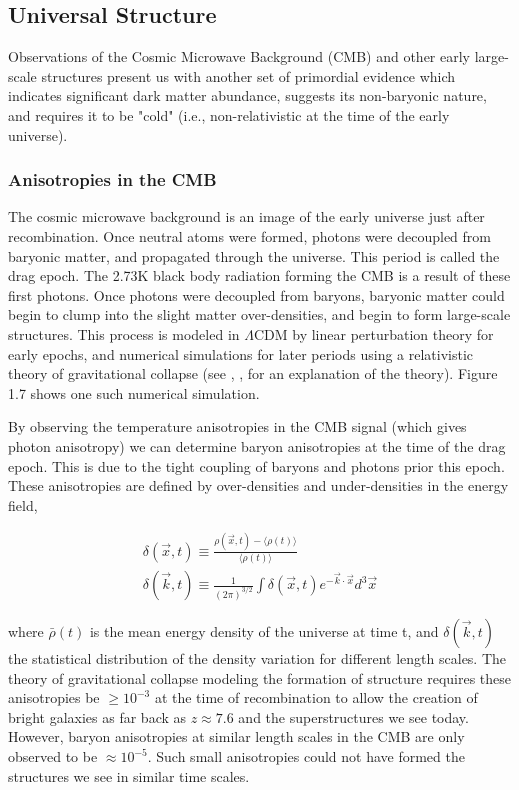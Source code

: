 \documentclass{report}
\begin{document}
\subsection{Universal Structure}
Observations of the Cosmic Microwave Background (CMB) and other early large-scale structures present us with another set of primordial evidence which indicates significant dark matter abundance, suggests its non-baryonic nature, and requires it to be "cold" (i.e., non-relativistic at the time of the early universe).

\subsubsection{Anisotropies in the CMB}
The cosmic microwave background is an image of the early universe just after recombination. Once neutral atoms were formed, photons were decoupled from baryonic matter, and propagated through the universe. This period is called the drag epoch. The 2.73K black body radiation forming the CMB is a result of these first photons. Once photons were decoupled from baryons, baryonic matter could begin to clump into the slight matter over-densities, and begin to form large-scale structures. This process is modeled in $\Lambda$CDM by linear perturbation theory for early epochs, and numerical simulations for later periods using a relativistic theory of gravitational collapse (see \cite{Kolb1990}, \cite{Padmanabhan1993}, \cite{Liddle2000} for an explanation of the theory). Figure 1.7 shows one such numerical simulation.

By observing the temperature anisotropies in the CMB signal (which gives photon anisotropy) we can determine baryon anisotropies at the time of the drag epoch. This is due to the tight coupling of baryons and photons prior this epoch. These anisotropies are defined by over-densities and under-densities in the energy field,

\begin{eqnarray}
\delta(\vec{x},t) \equiv \frac{\rho(\vec{x},t) - \langle\rho(t)\rangle}{\langle\rho(t)\rangle} \\
\delta(\vec{k},t) \equiv \frac{1}{(2\pi)^{3/2}} \int \delta(\vec{x},t) e^{-\vec{k} \cdot \vec{x}} d^3 \vec{x}
\end{eqnarray}

where $\bar{\rho}(t)$ is the mean energy density of the universe at time t, and $\delta(\vec{k},t)$ the statistical distribution of the density variation for different length scales. The theory of gravitational collapse modeling the formation of structure requires these anisotropies be $\geq 10^{-3}$ at the time of recombination to allow the creation of bright galaxies as far back as $z \approx 7.6 $ \cite{Bradley2008} and the superstructures we see today. However, baryon anisotropies at similar length scales in the CMB are only observed to be $\approx 10^{-5}$. Such small anisotropies could not have formed the structures we see in similar time scales.
\end{document}
